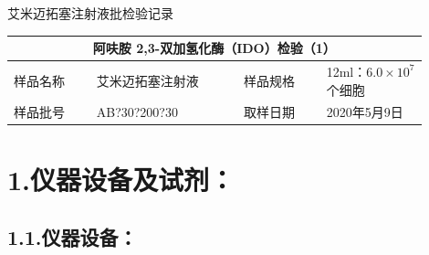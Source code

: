 \documentclass[UTF8,10pt,a4paper,fontset=fandol]{ctexart}
\newcommand{\fieldvalue}[1]{#1}
\newcommand{\handwritten}[1]{#1}
\begin{document}
\newpage

\begin{center}
{\large 艾米迈拓塞注射液批检验记录}

\medskip
\begin{tabular}{|p{0.18\linewidth}|p{0.32\linewidth}|p{0.18\linewidth}|p{0.22\linewidth}|}
\hline
\multicolumn{4}{|c|}{阿呋胺 2,3-双加氢化酶（IDO）检验（1）}\\
\hline
样品名称 &
\fieldvalue{艾米迈拓塞注射液} &
样品规格 &
\fieldvalue{12ml：$6.0\times 10^{7}$个细胞}\\
\hline
样品批号 &
\fieldvalue{\handwritten{AB?30?200?30}} &
取样日期 &
\fieldvalue{\handwritten{2020年5月9日}}\\
\hline
\end{tabular}
\end{center}

\section*{1.\quad 仪器设备及试剂：}

\subsection*{1.1.\quad 仪器设备：}
\end{document}

